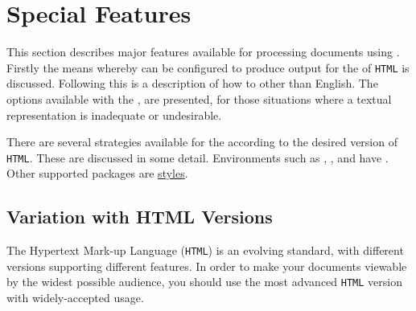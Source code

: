 \section{Special Features}
\label{sec:fea}%
\html{\\}\noindent
This {section} describes major features available for processing
documents using \latextohtml.
Firstly the means whereby \latextohtml{} can be configured to produce output 
for the  of \texttt{HTML} 
is discussed.
Following this is a description
of how to  other than English. 
The options available with the ,
are presented,
for those situations where a textual representation is inadequate or undesirable.

There are several strategies available for the  according to the desired version of \texttt{HTML}. 
These are discussed in some detail. 
Environments such as , , 
and  have %
. 
Other supported packages are \hyperref{listed}{listed in Table~}{}{styles}.


\subsection{Variation with HTML Versions\label{versions}}%
%
%
%
%
\html{\\}\noindent
The Hypertext Mark-up Language (\texttt{HTML}) is an evolving standard,
with different versions supporting different features.  
In order to make your documents viewable by the widest possible audience,
you should use the most advanced \texttt{HTML} version with widely-accepted usage.

%
%
%
%
%

